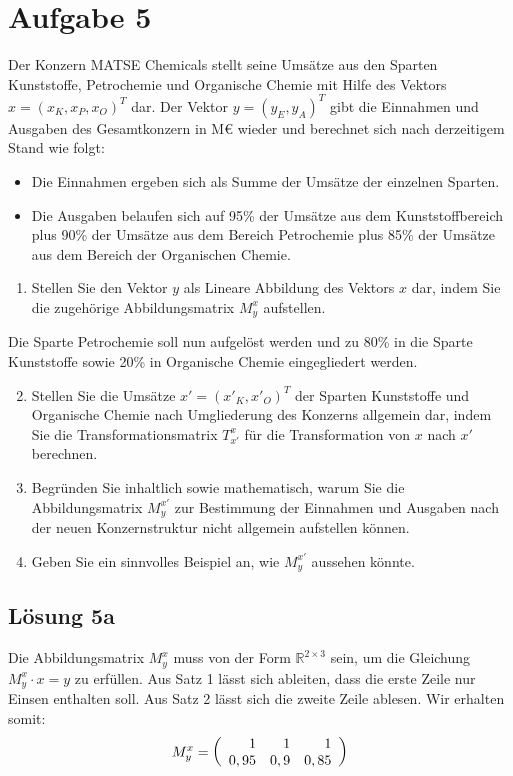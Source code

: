 \documentclass[main.tex]{subfiles}7
\begin{document}
\section{Aufgabe 5}
Der Konzern MATSE Chemicals stellt seine Umsätze aus den Sparten Kunststoffe, Petrochemie
und Organische Chemie mit Hilfe des Vektors $x = (x_K, x_P, x_O)^T$ dar. Der Vektor
$y = (y_E, y_A)^T$ gibt die Einnahmen und Ausgaben des Gesamtkonzern in M€ wieder und
berechnet sich nach derzeitigem Stand wie folgt:
\begin{itemize}
    \item Die Einnahmen ergeben sich als Summe der Umsätze der einzelnen Sparten.
    \item Die Ausgaben belaufen sich auf 95\% der Umsätze aus dem Kunststoffbereich plus 90\%
    der Umsätze aus dem Bereich Petrochemie plus 85\% der Umsätze aus dem Bereich der
    Organischen Chemie.
\end{itemize}

\begin{enumerate}
    \item Stellen Sie den Vektor $y$ als Lineare Abbildung des Vektors $x$ dar, indem Sie die zugehörige Abbildungsmatrix $M^x_y$ aufstellen.
\end{enumerate}
Die Sparte Petrochemie soll nun aufgelöst werden und zu 80\% in die Sparte Kunststoffe sowie
20\% in Organische Chemie eingegliedert werden.

\begin{enumerate}
    \setcounter{enumi}{1}
    \item Stellen Sie die Umsätze $x' =(x'_K, x'_O)^T$ der Sparten Kunststoffe und Organische Chemie
    nach Umgliederung des Konzerns allgemein dar, indem Sie die Transformationsmatrix
    $T^x_{x'}$ für die Transformation von $x$ nach $x'$ berechnen.
    \item Begründen Sie inhaltlich sowie mathematisch, warum Sie die Abbildungsmatrix $M^{x'}_y$ zur Bestimmung der Einnahmen und Ausgaben nach der neuen Konzernstruktur nicht
    allgemein aufstellen können.
    \item Geben Sie ein sinnvolles Beispiel an, wie $M^{x'}_y$ aussehen könnte.
\end{enumerate}

\subsection{Lösung 5a}
Die Abbildungsmatrix $M^x_y$ muss von der Form $\mathbb{R}^{2\times 3}$ sein, um die Gleichung $M^x_y \cdot x = y$ zu erfüllen.
Aus Satz 1 lässt sich ableiten, dass die erste Zeile nur Einsen enthalten soll.
Aus Satz 2 lässt sich die zweite Zeile ablesen. Wir erhalten somit:
$$
    M^x_y = \eqmatrix{rrr}{1 & 1 & 1 \\ 0,95 & 0,9 & 0,85}
$$
\end{document}

